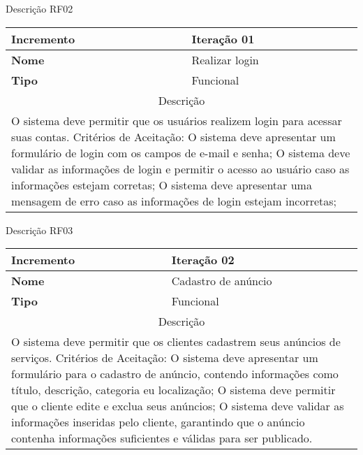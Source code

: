 \begin{quadro}[htb]
	\centering
	\caption{\label{Formatação do texto.}Descrição RF02}	
	\begin{tabular}{|l|p{11cm}|}
		\hline
		\textbf{Incremento}    & Iteração 01\\ \hline
		\textbf{Nome}    & Realizar login\\ \hline
		\textbf{Tipo}    & Funcional\\ \hline
		\multicolumn{2}{|c|}{Descrição}\\ \hline
		\multicolumn{2}{|p{12cm}|}{
			O sistema deve permitir que os usuários realizem login para acessar suas contas. \newline
			\newline Critérios de Aceitação: \newline
			O sistema deve apresentar um formulário de login com os campos de e-mail e senha; \newline
			\newline O sistema deve validar as informações de login e permitir o acesso ao usuário caso as informações estejam corretas;\newline
			\newline O sistema deve apresentar uma mensagem de erro caso as informações de login estejam incorretas;
			}\\ \hline
	\end{tabular}
\end{quadro}

\begin{quadro}[htb]
	\centering
	\caption{\label{Formatação do texto.}Descrição RF03}	
	\begin{tabular}{|l|p{11cm}|}
		\hline
		\textbf{Incremento}    & Iteração 02\\ \hline
		\textbf{Nome}    & Cadastro de anúncio\\ \hline
		\textbf{Tipo}    & Funcional\\ \hline
		\multicolumn{2}{|c|}{Descrição}\\ \hline
		\multicolumn{2}{|p{12cm}|}{
			O sistema deve permitir que os clientes cadastrem seus anúncios de serviços. \newline
			\newline Critérios de Aceitação: \newline
			O sistema deve apresentar um formulário para o cadastro de anúncio, contendo informações como título, descrição, categoria eu localização; \newline
			\newline O sistema deve permitir que o cliente edite e exclua seus anúncios;\newline
			\newline O sistema deve validar as informações inseridas pelo cliente, garantindo que o anúncio contenha informações suficientes e válidas para ser publicado.
			} \\ \hline
	\end{tabular}
\end{quadro}

